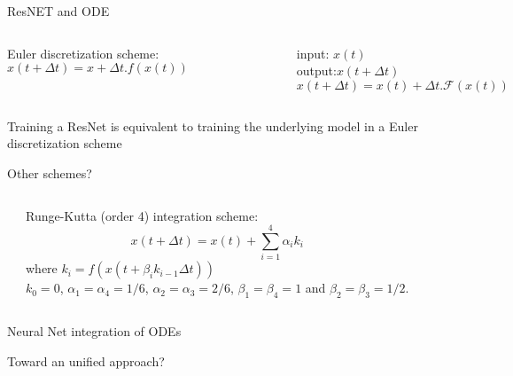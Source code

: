 \documentclass[handout]{beamer}
\newcommand{\rref}[1][]{\hfill{\scriptsize\textit{#1}}}
\begin{document}
\begin{frame}{ResNET and ODE}
\begin{columns}
Euler discretization scheme:
$$
 x(t+\Delta t) = x + \Delta t.f(x(t)) 
$$
\pause
{}
    \begin{figure}
    \centering
    \includegraphics[width=.9\textwidth]{fig/L2/res_block.png}

    \end{figure}
    input: $x(t)$~\\ output:$x(t+\Delta t)$
    $$
    x(t+\Delta t) = x(t) + \Delta t.\mathcal{F}(x(t)) 
    $$
    
    \end{columns}
    \pause
    \alert{Training a ResNet is equivalent to training the underlying model in a Euler discretization scheme}
\end{frame}
\begin{frame}{Other schemes?}
\begin{columns}
\rref[\cite{Fablet2017}]

Runge-Kutta (order 4) integration scheme:
$$
x(t+\Delta t) = x(t) + \sum_{i=1}^4 \alpha_i k_i
$$
where $k_i = f(x(t+\beta_i k_{i-1}\Delta t))$\\
$k_0=0$, 
$\alpha_1=\alpha_4=1/6$,
$\alpha_2=\alpha_3=2/6$,
$\beta_1=\beta_4=1$ 
and  $\beta_2=\beta_3=1/2$.

\end{columns}
\end{frame}

\begin{frame}{Neural Net integration of ODEs}
    
\end{frame}
\begin{frame}{Toward an unified approach?}
    
\end{frame}
\end{document}
